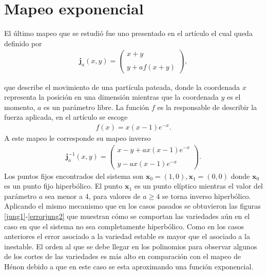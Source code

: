 \section{Mapeo exponencial}
El último mapeo que se estudió fue uno presentado en el artículo \citep{Jung} el cual queda definido por 
\begin{eqnarray}
\mathbf{j}_{a}(x,y)=\left(\begin{array}{lcc}
             x+y\\
             \\ y+af(x+y)
             \end{array}\right),
\label{Jung}
\end{eqnarray}

que describe el movimiento de una partícula pateada, donde la coordenada $x$ representa la posición en una dimensión mientras que la coordenada $y$ es el momento, $a$ es un parámetro libre. La función $f$ es la responsable de describir la fuerza aplicada, en el artículo \cite{Jung} se escoge
\begin{eqnarray*}
f(x)=x(x-1)e^{-x}.
\end{eqnarray*}
A este mapeo le corresponde su mapeo inverso
\begin{eqnarray}
\mathbf{j}^{-1}_{a}(x,y)=\left(\begin{array}{lcc}
             x-y+ax(x-1)e^{-x}\\
             \\ y-ax(x-1)e^{-x}
             \end{array}\right).
             \label{jungI}
\end{eqnarray}
Los puntos fijos encontrados del sistema son $\mathbf{x}_{0}=(1,0), \mathbf{x}_{1}=(0,0)$ donde $\mathbf{x}_{0}$ es un punto fijo hiperbólico. El punto $\mathbf{x}_{1}$ es un punto elíptico mientras el valor del parámetro $a$ sea menor a 4, para valores de $a \geq 4$ se torna inverso hiperbólico.\\

Aplicando el mismo mecanismo que en los casos pasados se obtuvieron las figuras \ref{jung1}-\ref{errorjung2} que muestran cómo se comportan las variedades aún en el caso en que el sistema no sea completamente hiperbólico. Como en los casos anteriores el error asociado a la variedad estable es mayor que el asociado a la inestable. El orden al que se debe llegar en los polinomios para observar algunos de los cortes de las variedades es más alto en comparación con el mapeo de Hénon debido a que en este caso se esta aproximando una función exponencial.

